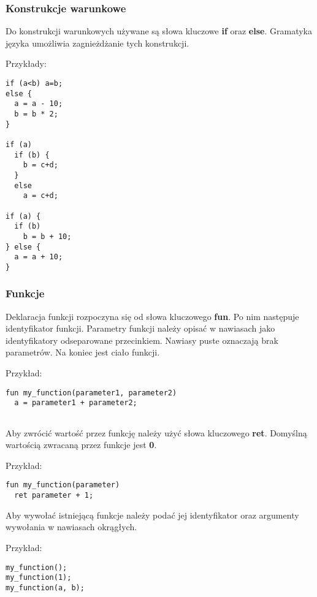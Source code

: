 \documentclass[12pt,a4paper]{article}
\begin{document}
\subsubsection{Konstrukcje warunkowe}

Do konstrukcji warunkowych używane są słowa kluczowe \textbf{if} oraz \textbf{else}. Gramatyka języka umożliwia zagnieżdżanie tych konstrukcji.

Przykłady:
\lstset{language=Python}
\begin{lstlisting}
if (a<b) a=b;
else {
  a = a - 10;
  b = b * 2;
}

if (a)
  if (b) {
    b = c+d;
  }
  else
    a = c+d;
    
if (a) {
  if (b)
    b = b + 10;
} else { 
  a = a + 10;
}

\end{lstlisting}

\subsubsection{Funkcje}

Deklaracja funkcji rozpoczyna się od słowa kluczowego \textbf{fun}.
Po nim następuje identyfikator funkcji. Parametry funkcji należy opisać w nawiasach jako identyfikatory odseparowane przecinkiem. Nawiasy puste oznaczają brak parametrów. Na koniec jest ciało funkcji.

\medskip

Przykład:

\begin{lstlisting}
fun my_function(parameter1, parameter2)
  a = parameter1 + parameter2;
  
\end{lstlisting}

Aby zwrócić wartość przez funkcję należy użyć słowa kluczowego \textbf{ret}. Domyślną wartością zwracaną przez funkcje jest \textbf{0}.

\medskip
Przykład:

\begin{lstlisting}
fun my_function(parameter)
  ret parameter + 1;

\end{lstlisting}

Aby wywołać istniejącą funkcje należy podać jej identyfikator oraz argumenty wywołania w nawiasach okrągłych.

\medskip
Przykład:

\begin{lstlisting}
my_function();
my_function(1);
my_function(a, b);
\end{lstlisting}
\end{document}
